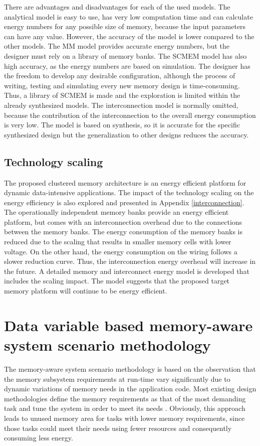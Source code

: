 There are advantages and disadvantages for each of the used models.
The analytical model is easy to use, has very low computation time and can calculate energy numbers for any possible size of memory, because the input parameters can have any value.
However, the accuracy of the model is lower compared to the other models.
The MM model provides accurate energy numbers, but the designer must rely on a library of memory banks.
The SCMEM model has also high accuracy, as the energy numbers are based on simulation.
The designer has the freedom to develop any desirable configuration, although the process of writing, testing and simulating every new memory design is time-consuming.
Thus, a library of SCMEM is made and the exploration is limited within the already synthesized models.
The interconnection model is normally omitted, because the contribution of the interconnection to the overall energy consumption is very low.
The model is based on synthesis, so it is accurate for the specific synthesized design but the generalization to other designs reduces the accuracy. 

\subsection{Technology scaling}

The proposed clustered memory architecture is an energy efficient platform for dynamic data-intensive applications.
The impact of the technology scaling on the energy efficiency is also explored and presented in Appendix \ref{interconnection}. 
The operationally independent memory banks provide an energy efficient platform, but comes with an interconnection overhead due to the connections between the memory banks. 
The energy consumption of the memory banks is reduced due to the scaling that results in smaller memory cells with lower voltage.
On the other hand, the energy consumption on the wiring follows a slower reduction curve.
Thus, the interconnection energy overhead will increase in the future.
A detailed memory and interconnect energy model is developed that includes the scaling impact.
The model suggests that the proposed target memory platform will continue to be energy efficient.

\section{Data variable based memory-aware system scenario methodology}

The memory-aware system scenario methodology is based on the observation that the memory subsystem requirements at run-time vary significantly due to dynamic variations of memory needs in the application code. 
Most existing design methodologies define the memory requirements as that of the most demanding task and tune the system in order to meet its needs \cite{tcm}. 
Obviously, this approach leads to unused memory area for tasks with lower memory requirements, since those tasks could meet their needs using fewer resources and consequently consuming less energy. 


